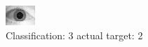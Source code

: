 \begin{figure}[h!]
\begin{center}
\includegraphics[width=0.60\columnwidth]{figures/ID1616_class_3_target_2.png}
\end{center}
\caption{ Classification: 3 actual target: 2}
\label{fig:ID1616_class_3_target_2}
\end{figure}
